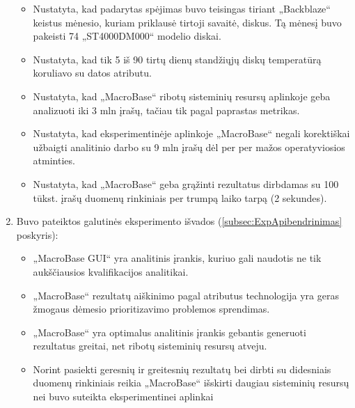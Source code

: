 \documentclass{VUMIFPSkursinis}
\begin{document}
\begin{enumerate}
\begin{itemize}
\item Nustatyta, kad padarytas spėjimas buvo teisingas tiriant „Backblaze“ keistus mėnesio, kuriam priklausė tirtoji savaitė, diskus. Tą mėnesį buvo pakeisti 74 „ST4000DM000“ modelio diskai.

\item Nustatyta, kad tik 5 iš 90 tirtų dienų standžiųjų diskų temperatūrą koruliavo su datos atributu.

\item Nustatyta, kad „MacroBase“ ribotų sisteminių resursų aplinkoje geba analizuoti iki 3 mln įrašų, tačiau tik pagal paprastas metrikas.

\item Nustatyta, kad eksperimentinėje aplinkoje „MacroBase“ negali korektiškai užbaigti analitinio darbo su 9 mln įrašų dėl per per mažos operatyviosios atminties.

\item Nustatyta, kad „MacroBase“ geba grąžinti rezultatus dirbdamas su 100 tūkst. įrašų duomenų rinkiniais per trumpą laiko tarpą (2 sekundes).
\end{itemize}

\item Buvo pateiktos galutinės eksperimento išvados (\ref{subsec:ExpApibendrinimas} poskyris):
\begin{itemize}
\item „MacroBase GUI“ yra analitinis įrankis, kuriuo gali naudotis ne tik aukščiausios kvalifikacijos analitikai.

\item „MacroBase“ rezultatų aiškinimo pagal atributus technologija yra geras žmogaus dėmesio prioritizavimo problemos sprendimas.

\item „MacroBase“ yra optimalus analitinis įrankis gebantis generuoti rezultatus greitai, net ribotų sisteminių resursų atveju.

\item Norint pasiekti geresnių ir greitesnių rezultatų bei dirbti su didesniais duomenų rinkiniais reikia „MacroBase“ išskirti daugiau sisteminių resursų nei buvo suteikta eksperimentinei aplinkai
\end{itemize}
\end{enumerate}

\printbibliography[heading=bibintoc]
\end{document}
